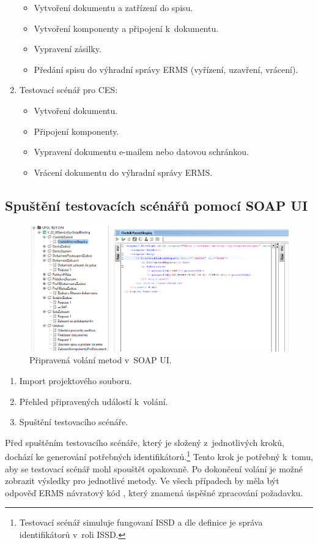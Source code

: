 \documentclass[
  master,
  field=ainfp,
  biblatex,
  language=czech,
  glossaries,
  theorems=false,
  index
]{kidiplom}
\begin{document}
\begin{enumerate}
\begin{itemize}
		\item Vytvoření dokumentu a zatřízení do spisu.
		\item Vytvoření komponenty a připojení k~dokumentu.
		\item Vypravení zásilky.
		\item Předání spisu do výhradní správy ERMS (vyřízení, uzavření, vrácení).
	\end{itemize}
	\item Testovací scénář pro CES:
	\begin{itemize}
		\item Vytvoření dokumentu.
		\item Připojení komponenty.
		\item Vypravení dokumentu e-mailem nebo datovou schránkou.
		\item Vrácení dokumentu do výhradní správy ERMS.
	\end{itemize}
\end{enumerate}

\subsection{Spuštění testovacích scénářů pomocí SOAP UI}
\begin{figure}[h]
  \centerline{\includegraphics[width=0.9\linewidth]{./images/SOAPUI2.png}} 
  \caption{Připravená volání metod v~SOAP UI.} 
\end{figure}
\begin{enumerate}
	\item Import projektového souboru.
	\item Přehled připravených událostí k~volání.
	\item Spuštění testovacího scénáře.
\end{enumerate}

Před spuštěním testovacího scénáře, který je složený z~jednotlivých kroků, dochází ke generování potřebných identifikátorů.\footnote{Testovací scénář simuluje fungovaní ISSD a dle definice je správa identifikátorů v~roli ISSD.} Tento krok je potřebný k~tomu, aby se testovací scénář mohl spouštět opakovaně. Po dokončení volání je možné zobrazit výsledky pro jednotlivé metody. Ve všech případech by měla být odpověď ERMS návratový kód , který znamená úspěšné zpracování požadavku.
\end{document}
